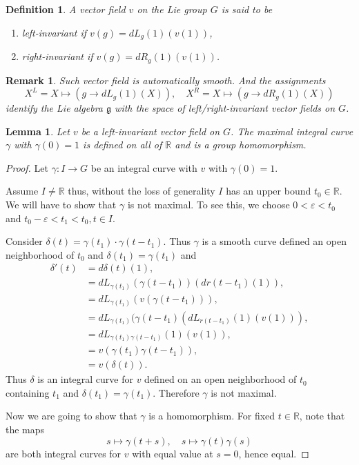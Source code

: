 \documentclass{article}
\newtheorem{definition}{Definition}[section]
\newtheorem{lemma}{Lemma}[section]
\newtheorem{remark}{Remark}[section]
\numberwithin{equation}{section}
\begin{document}
\begin{definition}
A vector field $v$ on the Lie group $G$ is said to be
\begin{enumerate}[1).]
\item left-invariant if $v(g) = dL_g(1)(v(1))$,
\item right-invariant if $v(g) = dR_g(1)(v(1))$.
\end{enumerate}
\end{definition}

\begin{remark}
Such vector field is automatically smooth. And the assignments 
\begin{equation*}
X^L=X\mapsto(g\to dL_g(1)(X)), \quad X^R= X\mapsto(g\to dR_g(1)(X))
\end{equation*}
identify the Lie algebra $\mathfrak{g}$ with the space of left/right-invariant vector fields on $G$.
\end{remark}

\begin{lemma}
Let $v$ be a left-invariant vector field on $G$. The maximal integral curve $\gamma$ with $\gamma(0)=1$ is defined on all of $\mathbb{R}$ and is a group homomorphism.
\label{max_int_curve}
\end{lemma}

\begin{proof}
Let $\gamma:I\to G$ be an integral curve with $v$ with $\gamma(0)=1$.\\
\par Assume $I\not=\mathbb{R}$ thus, without the loss of generality $I$ has an upper bound $t_0\in\mathbb{R}$. We will have to show that $\gamma$ is not maximal. To see this, we choose $0<\varepsilon<t_0$ and $t_0-\varepsilon<t_1<t_0, t\in I$.\\
\par Consider $\delta(t) = \gamma(t_1)\cdot\gamma(t-t_1)$. Thus $\gamma$ is a smooth curve defined an open neighborhood of $t_0$ and $\delta(t_1)=\gamma(t_1)$ and 
\begin{align*}
\delta'(t) &= d\delta(t)(1),\\
& = dL_{\gamma(t_1)}(\gamma(t-t_1))(dr(t-t_1)(1)),\\
& = dL_{\gamma(t_1)}(v(\gamma(t-t_1))),\\
& = dL_{\gamma(t_1)}(\gamma(t-t_1)(dL_{r(t-t_1)}(1)(v(1))),\\
& = dL_{\gamma(t_1)\gamma(t-t_1)}(1)(v(1)),\\
& = v(\gamma(t_1)\gamma(t-t_1)),\\
&= v(\delta(t)).
\end{align*}
Thus $\delta$ is an integral curve for $v$ defined on an open neighborhood of $t_0$ containing $t_1$ and $\delta(t_1) = \gamma(t_1)$. Therefore $\gamma$ is not maximal.\\
\par Now we are going to show that $\gamma$ is a homomorphism. For fixed $t\in \mathbb{R}$, note that the maps 
\begin{equation*}
s\mapsto\gamma(t+s),\quad s\mapsto\gamma(t)\gamma(s)
\end{equation*}
are both integral curves for $v$ with equal value at $s=0$, hence equal. 
\end{proof}
\end{document}

